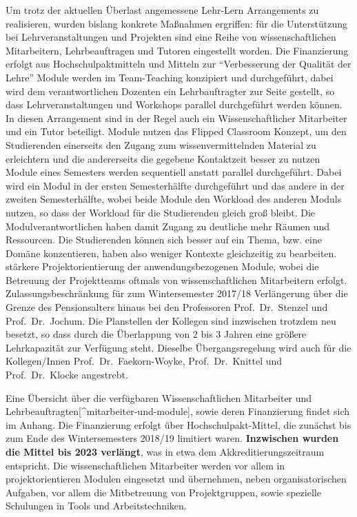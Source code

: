 Um trotz der aktuellen Überlast angemessene Lehr-Lern Arrangements zu
realisieren, wurden bislang konkrete Maßnahmen ergriffen: für die
Unterstützung bei Lehrveranstaltungen und Projekten sind eine Reihe von
wissenschaftlichen Mitarbeitern, Lehrbeauftragen und Tutoren eingestellt
worden. Die Finanzierung erfolgt aus Hochschulpaktmitteln und Mitteln
zur ``Verbesserung der Qualität der Lehre'' Module werden im
Team-Teaching konzipiert und durchgeführt, dabei wird dem
verantwortlichen Dozenten ein Lehrbauftragter zur Seite gestellt, so
dass Lehrveranstaltungen und Workshops parallel durchgeführt werden
können. In diesen Arrangement sind in der Regel auch ein
Wissenschaftlicher Mitarbeiter und ein Tutor beteiligt. Module nutzen
das Flipped Classroom Konzept, um den Studierenden einerseits den Zugang
zum wissenvermittelnden Material zu erleichtern und die andererseits die
gegebene Kontaktzeit besser zu nutzen Module eines Semesters werden
sequentiell anstatt parallel durchgeführt. Dabei wird ein Modul in der
ersten Semesterhälfte durchgeführt und das andere in der zweiten
Semesterhälfte, wobei beide Module den Workload des anderen Moduls
nutzen, so dass der Workload für die Studierenden gleich groß bleibt.
Die Modulverantwortlichen haben damit Zugang zu deutliche mehr Räumen
und Ressourcen. Die Studierenden können sich besser auf ein Thema, bzw.
eine Domäne konzentieren, haben also weniger Kontexte gleichzeitig zu
bearbeiten. stärkere Projektorientierung der anwendungsbezogenen Module,
wobei die Betreuung der Projektteams oftmals von wissenschaftlichen
Mitarbeitern erfolgt. Zulassungsbeschränkung für zum Wintersemester
2017/18 Verlängerung über die Grenze des Pensionsalters hinaus bei den
Professoren Prof.~Dr.~Stenzel und Prof.~Dr.~Jochum. Die Planstellen der
Kollegen sind inzwischen trotzdem neu besetzt, so dass durch die
Überlappung von 2 bis 3 Jahren eine größere Lehrkapazität zur Verfügung
steht. Dieselbe Übergangsregelung wird auch für die Kollegen/Innen
Prof.~Dr.~Faekorn-Woyke, Prof.~Dr.~Knittel und Prof.~Dr.~Klocke
angestrebt.

Eine Übersicht über die verfügbaren Wissenschaftlichen Mitarbeiter und
Lehrbeauftragten{[}\^{}mitarbeiter-und-module{]}, sowie deren
Finanzierung findet sich im Anhang. Die Finanzierung erfolgt über
Hochschulpakt-Mittel, die zunächst bis zum Ende des Wintersemesters
2018/19 limitiert waren. \textbf{Inzwischen wurden die Mittel bis 2023
verlängt}, was in etwa dem Akkreditierungszeitraum entspricht. Die
wissenschaftlichen Mitarbeiter werden vor allem in projektorientieren
Modulen eingesetzt und übernehmen, neben organisatorischen Aufgaben, vor
allem die Mitbetreuung von Projektgruppen, sowie spezielle Schulungen in
Tools und Arbeitstechniken.

